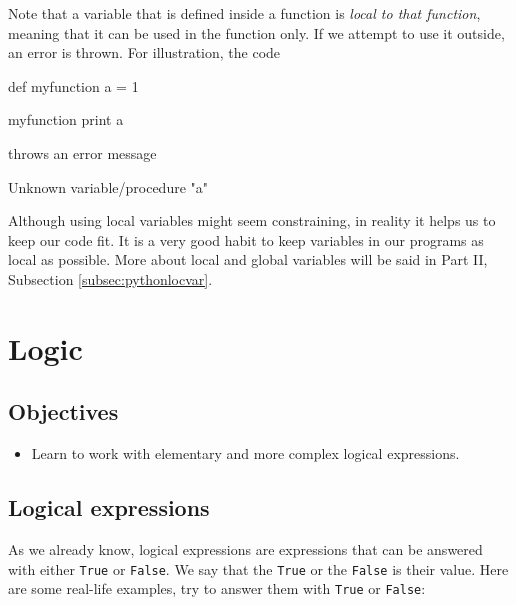 Note that a variable that is defined inside a function is {\em local to that function}, 
meaning that it can be used in the function only. If we attempt to use it 
outside, an error is thrown. For illustration, the code 

\begin{bluecode}
def myfunction
  a = 1

myfunction
print a  
\end{bluecode}
throws an error message 

\begin{redcode}
Unknown variable/procedure "a" 
\end{redcode}
Although using local variables might seem constraining, in reality it helps us 
to keep our code fit. It is a very good habit to keep variables in our programs 
as local as possible. More about local and global variables will be said in 
Part II, Subsection \ref{subsec:pythonlocvar}.


\section{Logic} \label{sec:logic}

\subsection{Objectives} 
 
\begin{itemize}
\item Learn to work with elementary and more complex logical expressions.
\end{itemize}

\subsection{Logical expressions}
As we already know, logical expressions are expressions that can be answered with either {\tt True} or 
{\tt False}. We say that the {\tt True} or the {\tt False} is their value. Here are some 
real-life examples, try to answer them with {\tt True} or {\tt False}:

